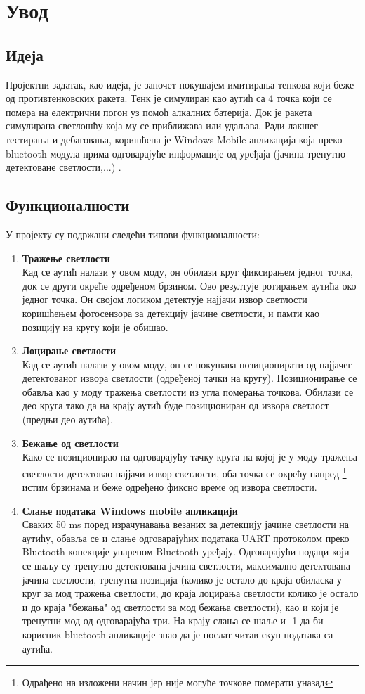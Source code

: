 \chapter{Увод}
\section{Идеја}
Пројектни задатак, као идеја, је започет покушајем имитирања тенкова који беже од противтенковских ракета. Тенк је симулиран као аутић са 4 точка који се помера на електрични погон уз помоћ алкалних батерија. Док је ракета симулирана светлошћу која му се приближава или удаљава. Ради лакшег тестирања и дебаговања, коришћена је Windows Mobile апликација \cite{BluetoothTerminal} која преко bluetooth модула прима одговарајуће информације од уређаја (јачина тренутно детектоване светлости,...) . 

\section{Функционалности}
У пројекту су подржани следећи типови функционалности:
\begin{enumerate}[1.]
\item \textbf{Тражење светлости}
\\ Кад се аутић налази у овом моду, он обилази круг фиксирањем једног точка, док се други окреће одређеном брзином. Ово резултује ротирањем аутића око једног точка. Он својом логиком детектује најјачи извор светлости коришћењем фотосензора за детекцију јачине светлости, и памти као позицију на кругу који је обишао.
\item \textbf{Лоцирање светлости}
\\ Кад се аутић налази у овом моду, он се покушава позиционирати од најјачег детектованог извора светлости (одређеној тачки на кругу). Позиционирање се обавља као у моду тражења светлости из угла померања точкова.  Обилази се део круга тако да на крају аутић буде позициониран од извора светлост (предњи део аутића).
\item \textbf{Бежање од светлости}
\\ Како се позиционирао на одговарајућу тачку круга на којој је у моду тражења светлости детектовао најјачи извор светлости, оба точка се окрећу напред \footnote{Одрађено на изложени начин јер није могуће точкове померати уназад} истим брзинама и беже одређено фиксно време од извора светлости.
\item \textbf{Слање података Windows mobile апликацији}
\\ Сваких 50 ms поред израчунавања везаних за детекцију јачине светлости на аутићу, обавља се и слање одговарајућих података UART протоколом  преко Bluetooth конекције упареном Bluetooth уређају. Одговарајући подаци који се шаљу су тренутно детектована јачина светлости, максимално детектована јачина светлости, тренутна позиција (колико је остало до краја обиласка у круг за мод тражења светлости, до краја лоцирања светлости колико је остало и до краја "бежања" од светлости за мод бежања светлости), као и који је тренутни мод од одговарајућа три. На крају слања се шаље и -1 да би корисник bluetooth апликације знао да је послат читав скуп података са аутића.  

\end{enumerate}